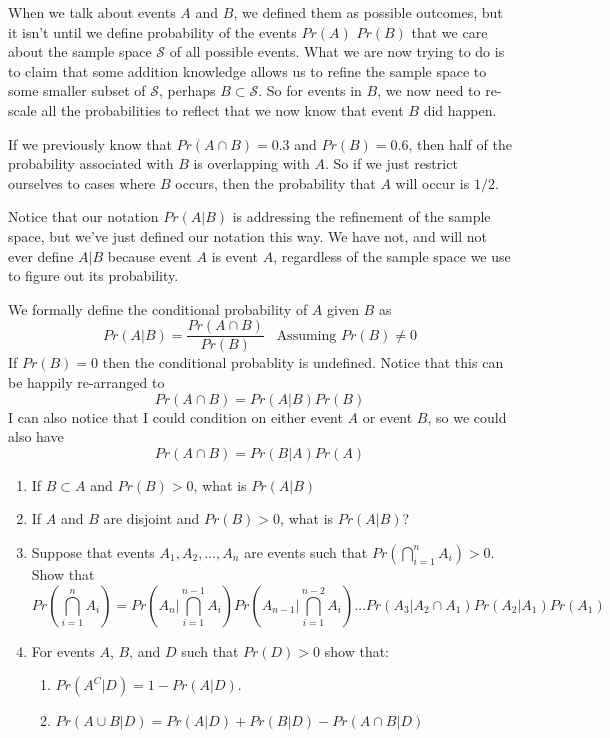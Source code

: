 \documentclass[]{book}
\providecommand{\tightlist}{%
  \setlength{\itemsep}{0pt}\setlength{\parskip}{0pt}}
\begin{document}
When we talk about events \(A\) and \(B\), we defined them as possible
outcomes, but it isn't until we define probability of the events
\(Pr(A)\) \(Pr(B)\) that we care about the sample space \(\mathcal{S}\)
of all possible events. What we are now trying to do is to claim that
some addition knowledge allows us to refine the sample space to some
smaller subset of \(\mathcal{S}\), perhaps \(B\subset \mathcal{S}\). So
for events in \(B\), we now need to re-scale all the probabilities to
reflect that we now know that event \(B\) did happen.

If we previously know that \(Pr(A\cap B)=0.3\) and \(Pr(B)=0.6\), then
half of the probability associated with \(B\) is overlapping with \(A\).
So if we just restrict ourselves to cases where \(B\) occurs, then the
probability that \(A\) will occur is \(1/2\).

Notice that our notation \(Pr( A | B)\) is addressing the refinement of
the sample space, but we've just defined our notation this way. We have
not, and will not ever define \(A|B\) because event \(A\) is event
\(A\), regardless of the sample space we use to figure out its
probability.

We formally define the conditional probability of \(A\) given \(B\) as
\[Pr(A|B) = \frac{ Pr(A \cap B)}{Pr(B)} \;\;\; \textrm{Assuming } Pr(B) \ne 0\]
If \(Pr(B)=0\) then the conditional probablity is undefined. Notice that
this can be happily re-arranged to \[ Pr( A \cap B) = Pr(A | B) Pr(B) \]
I can also notice that I could condition on either event \(A\) or event
\(B\), so we could also have \[Pr( A \cap B) = Pr(B|A)Pr(A)\]

\begin{enumerate}
\def\labelenumi{\arabic{enumi}.}
\setcounter{enumi}{3}
\item
  If \(B \subset A\) and \(Pr(B)>0\), what is \(Pr(A|B)\)
\item
  If \(A\) and \(B\) are disjoint and \(Pr(B)>0\), what is \(Pr(A|B)\)?
\item
  Suppose that events \(A_1,A_2,\dots,A_n\) are events such that
  \(Pr\left( \bigcap_{i=1}^n A_i \right) > 0\). Show that
  \[Pr\left( \bigcap_{i=1}^n A_i \right) = Pr\left( A_n  \Big\rvert \bigcap_{i=1}^{n-1}A_i \right)
                                       Pr\left( A_{n-1}  \Big\rvert \bigcap_{i=1}^{n-2}A_i \right)\dots
                                       Pr\left( A_3 \Big\rvert A_2 \cap A_1 \right) 
                                       Pr\left( A_2 \Big\rvert A_1 \right)
                                       Pr\left( A_1 \right)\]
\item
  For events \(A\), \(B\), and \(D\) such that \(Pr(D)>0\) show that:

  \begin{enumerate}
  \def\labelenumii{\alph{enumii})}
  \tightlist
  \item
    \(Pr(A^C | D) = 1 - Pr(A | D)\).
  \item
    \(Pr( A \cup B \Big\rvert D) = Pr(A | D) + Pr(B|D) - Pr( A \cap B | D)\)
  \end{enumerate}
\end{enumerate}
\end{document}
